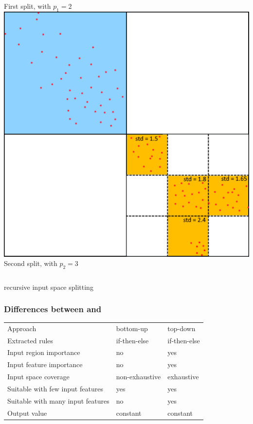 \documentclass[presentation]{beamer}
\begin{document}
\begin{frame}
\begin{columns}[t]
			\scriptsize First split, with $p_1=2$
			\centering
			\includegraphics[width = \columnwidth]{img/demo/3.pdf}\\
			\scriptsize Second split, with $p_2=3$
	\end{columns}
	\centering
	\vspace{10px} \gridex recursive input space splitting
\end{frame}

\begin{frame}
\frametitle{Differences between \iter and \gridex}
	\centering
	\begin{tabular}{l|l|l}
		& \iter & \gridex \\
		\hline\hline
		Approach & bottom-up & top-down \\
		Extracted rules & if-then-else & if-then-else \\
		Input region importance & no & yes \\
		Input feature importance & no & yes \\
		Input space coverage & non-exhaustive & exhaustive \\
		Suitable with few input features & yes & yes \\
		Suitable with many input features & no & yes \\
		Output value & constant & constant 
	\end{tabular}
\end{frame}
\end{document}
